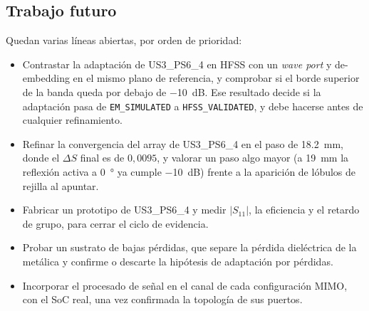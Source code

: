 \documentclass[11pt,a4paper]{article}
\begin{document}
\subsection{Trabajo futuro}\label{sec:futuro}
Quedan varias líneas abiertas, por orden de prioridad:
\begin{itemize}
    \item Contrastar la adaptación de US3\_PS6\_4 en HFSS con un \textit{wave port} y de-embedding en el mismo plano de referencia, y comprobar si el borde superior de la banda queda por debajo de \SI{-10}{dB}. Ese resultado decide si la adaptación pasa de \texttt{EM\_SIMULATED} a \texttt{HFSS\_VALIDATED}, y debe hacerse antes de cualquier refinamiento.
    \item Refinar la convergencia del array de US3\_PS6\_4 en el paso de \SI{18.2}{mm}, donde el $\Delta S$ final es de $0{,}0095$, y valorar un paso algo mayor (a \SI{19}{mm} la reflexión activa a \SI{0}{\degree} ya cumple \SI{-10}{dB}) frente a la aparición de lóbulos de rejilla al apuntar.
    \item Fabricar un prototipo de US3\_PS6\_4 y medir $|S_{11}|$, la eficiencia y el retardo de grupo,
    para cerrar el ciclo de evidencia.
    \item Probar un sustrato de bajas pérdidas, que separe la pérdida dieléctrica de la metálica y confirme
    o descarte la hipótesis de adaptación por pérdidas.
    \item Incorporar el procesado de señal en el canal de cada configuración MIMO, con el SoC real, una vez
    confirmada la topología de sus puertos.
\end{itemize}
\end{document}
